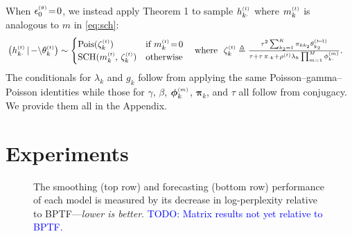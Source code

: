 \documentclass{article}
\begin{document}
When $\epstheta \teq0$, we instead apply Theorem 1 to sample $\hkdt$ where $\mkt$ is analogous to $m$ in \cref{eq:sch}:
% 
\begin{align}
\left(\hkdt \given {-\backslash} \thetakt\right) &\sim 
\begin{cases}
\textrm{Pois}(\zeta_{k}^{\mathsmaller{(t)}}) &\textrm{if } \mkt \teq 0 \\ 
% 
\textrm{SCH}(\mkt,\, \zeta_{k}^{\mathsmaller{(t)}}) &\textrm{otherwise}
\end{cases} 
\hspace{1em}\textrm{where }\,\,
\zeta_{k}^{\mathsmaller{(t)}} \triangleq \mathsmaller{\frac{\tau^2 \sum_{k_2=1}^K \pi_{kk_2} \thetakttm}{\tau + \tau\,\pi_{\cdot k} + \rhot \lambda_k \prod_{m=1}^M\phi^{\mathsmaller{(m)}}_{k\cdot }}}.
\end{align}
The conditionals for $\lambda_k$ and $g_k$ follow from applying the same Poisson--gamma--Poisson identities while those for $\gamma$, $\beta$, $\boldsymbol{\phi}^{\mathsmaller{(m)}}_k$, $\boldsymbol{\pi}_{k}$, and $\tau$ all follow from conjugacy. We provide them all in the Appendix.~

\section{Experiments}
\label{sec:experiments}
\begin{figure}[t]
\centering
{}\hfill
% 
\vspace{-0.5em}
\caption{\label{fig:experiments}\footnotesize The smoothing (top row) and forecasting (bottom row) performance of each model is measured by its decrease in log-perplexity relative to BPTF---\emph{lower is better}. \textcolor{blue}{TODO: Matrix results not yet relative to BPTF.}~}\vspace{-2em}
\end{figure}
\end{document}
